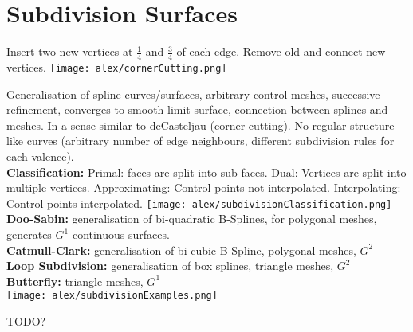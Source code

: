 \section{Subdivision Surfaces}

 Insert two new vertices at $\frac{1}{4}$ and $\frac{3}{4}$ of each edge. Remove old and connect new vertices.
\texttt{[image: alex/cornerCutting.png]}

 Generalisation of spline curves/surfaces, arbitrary control meshes, successive refinement, converges to smooth limit surface, connection between splines and meshes. In a sense similar to deCasteljau (corner cutting). No regular structure like curves (arbitrary number of edge neighbours, different subdivision rules for each valence). \\
\textbf{Classification:} Primal: faces are split into sub-faces. Dual: Vertices are split into multiple vertices. Approximating: Control points not interpolated. Interpolating: Control points interpolated.
\texttt{[image: alex/subdivisionClassification.png]}
\textbf{Doo-Sabin:} generalisation of bi-quadratic B-Splines, for polygonal meshes, generates $G^1$ continuous surfaces.\\
\textbf{Catmull-Clark:} generalisation of bi-cubic B-Spline, polygonal meshes, $G^2$\\
\textbf{Loop Subdivision:} generalisation of box splines, triangle meshes, $G^2$\\
\textbf{Butterfly:} triangle meshes, $G^1$\\
\texttt{[image: alex/subdivisionExamples.png]}

 TODO?

